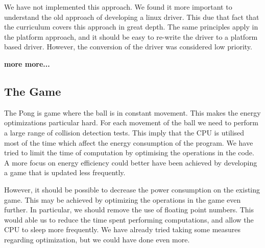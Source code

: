 We have not implemented this approach. We found it more important to understand the old approach of developing a linux driver. This due that fact that the curriculum covers this approach in great depth. The same principles apply in the platform approach, and it should be easy to re-write the driver to a platform based driver. However, the conversion of the driver was considered low priority. 

{\bf more more...}



\subsection{The Game}
The Pong is game where the ball is in constant movement. This makes the energy optimizations particular hard. For each movement of the ball we need to perform a large range of collision detection tests. This imply that the CPU is utilised most of the time which affect the energy consumption of the program. We have tried to limit the time of computation by optimising the operations in the code. A more focus on energy efficiency could better have been achieved by developing a game that is updated less frequently. 

However, it should be possible to decrease the power consumption on the existing game. This may be achieved by optimizing the operations in the game even further. In particular, we should remove the use of floating point numbers. This would able us to reduce the time spent performing computations, and allow the CPU to sleep more frequently. We have already tried taking some measures regarding optimization, but we could have done even more. 










